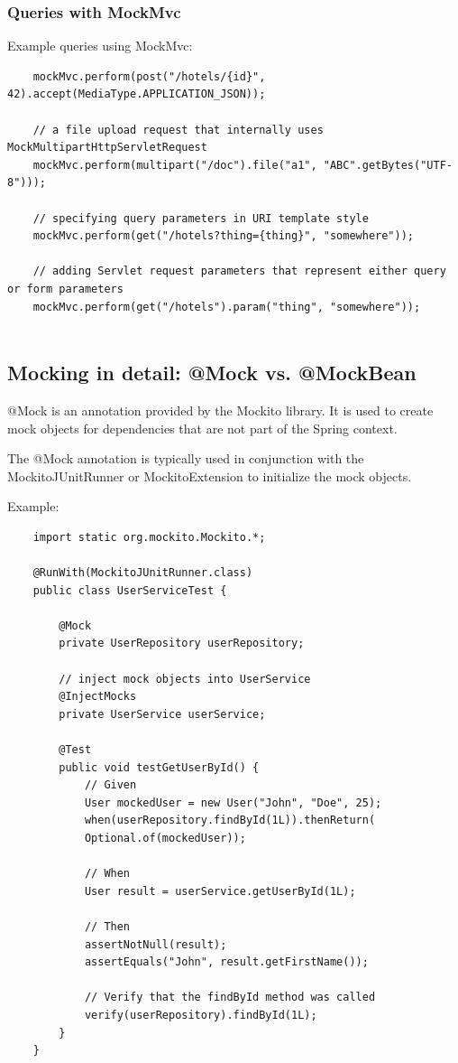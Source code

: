 \documentclass{scrartcl}
\begin{document}
\subsubsection{Queries with MockMvc}

Example queries using MockMvc:

\begin{lstlisting}
    mockMvc.perform(post("/hotels/{id}", 42).accept(MediaType.APPLICATION_JSON));

    // a file upload request that internally uses MockMultipartHttpServletRequest
    mockMvc.perform(multipart("/doc").file("a1", "ABC".getBytes("UTF-8")));

    // specifying query parameters in URI template style
    mockMvc.perform(get("/hotels?thing={thing}", "somewhere"));

    // adding Servlet request parameters that represent either query or form parameters
    mockMvc.perform(get("/hotels").param("thing", "somewhere"));


\end{lstlisting}


\subsection{Mocking in detail: @Mock vs. @MockBean}

@Mock is an annotation provided by the Mockito library. It is used to create mock objects for dependencies that are not part of the Spring context.

The @Mock annotation is typically used in conjunction with the MockitoJUnitRunner or MockitoExtension to initialize the mock objects.

Example:

\begin{lstlisting}
    import static org.mockito.Mockito.*;

    @RunWith(MockitoJUnitRunner.class)
    public class UserServiceTest {

        @Mock
        private UserRepository userRepository;

        // inject mock objects into UserService
        @InjectMocks
        private UserService userService;

        @Test
        public void testGetUserById() {
            // Given
            User mockedUser = new User("John", "Doe", 25);
            when(userRepository.findById(1L)).thenReturn(
            Optional.of(mockedUser));

            // When
            User result = userService.getUserById(1L);

            // Then
            assertNotNull(result);
            assertEquals("John", result.getFirstName());

            // Verify that the findById method was called
            verify(userRepository).findById(1L);
        }
    }
\end{lstlisting}
\end{document}
